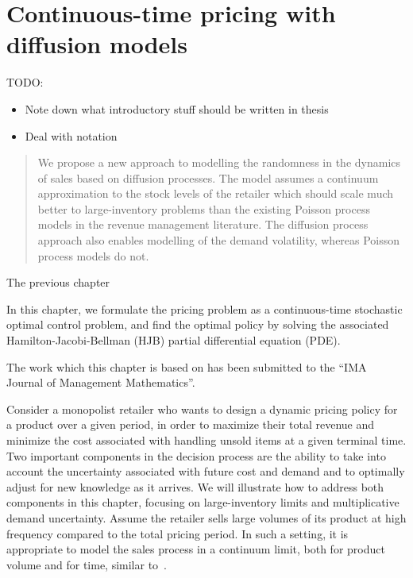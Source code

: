 \documentclass[main.tex]{subfiles}
\begin{document}
\chapter{Continuous-time pricing with diffusion
  models}\label{ch:cts_control}


TODO:
\begin{itemize}
\item Note down what introductory stuff should be written in thesis
\item Deal with notation
\end{itemize}

\begin{quote}


  We propose a new approach to modelling the randomness in the
  dynamics of sales based on diffusion processes. The model assumes a
  continuum approximation to the stock levels of the retailer which
  should scale much better to large-inventory problems than the
  existing Poisson process models in the revenue management literature.
  The diffusion process approach also enables modelling of the demand
  volatility, whereas Poisson process models do not.
\end{quote}


The previous chapter

In this chapter, we formulate the pricing problem as a
continuous-time stochastic optimal control problem, and find
the optimal policy by solving the associated Hamilton-Jacobi-Bellman
(HJB) partial differential equation (PDE).


The work which this chapter is based on has been submitted to
the ``IMA Journal of Management Mathematics''.

Consider a monopolist retailer who wants to design a dynamic pricing policy
for a product over a given period, in order to maximize their total
revenue and minimize the cost associated with handling unsold items
at a given terminal time.
Two important components in the decision process are the ability to
take into account the uncertainty associated with future cost and demand and to
optimally adjust for new knowledge as it arrives.
We will illustrate how to address both components in this chapter,
focusing on large-inventory limits and multiplicative demand
uncertainty.
Assume the retailer sells large volumes of its product at
high frequency compared to the total pricing period. In such a setting, it is
appropriate to model the sales process in a continuum limit, both for
product volume and for time, similar to~\cite{kalish1983monopolist}.
\end{document}
